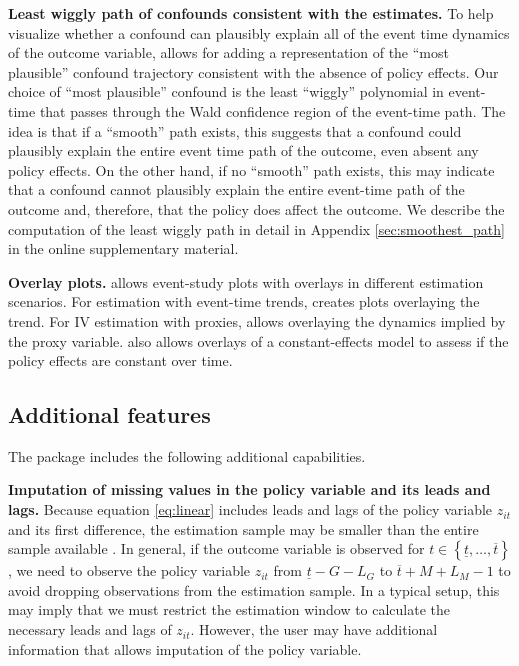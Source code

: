 \documentclass[12pt]{article}
\begin{document}
\noindent \textbf{Least wiggly path of confounds consistent with the estimates.}
To help visualize whether a confound can plausibly explain all of the event time dynamics of the outcome variable, \xtevent allows for adding a representation of the ``most plausible'' confound trajectory consistent with the absence of policy effects.
Our choice of ``most plausible'' confound is the least ``wiggly'' polynomial in event-time that passes through the Wald confidence region of the event-time path.
The idea is that if a ``smooth'' path exists, this suggests that a confound could plausibly explain the entire event time path of the outcome, even absent any policy effects.
On the other hand, if no ``smooth'' path exists, this may indicate that a confound cannot plausibly explain the entire event-time path of the outcome and, therefore, that the policy does affect the outcome.
We describe the computation of the least wiggly path in detail in Appendix \ref{sec:smoothest_path} in the online supplementary material.

\noindent \textbf{Overlay plots.}
\xteventplot allows event-study plots with overlays in different estimation scenarios. For estimation with event-time trends, \xteventplot creates plots overlaying the trend.
For IV estimation with proxies, \xteventplot allows overlaying the dynamics implied by the proxy variable.
\xteventplot also allows overlays of a constant-effects model to assess if the policy effects are constant over time.

\subsection{Additional features}
\label{subsec:additional_features}

The package includes the following additional capabilities.

\noindent \textbf{Imputation of missing values in the policy variable and its leads and lags.}
\label{newcite_sample}
Because equation \eqref{eq:linear} includes leads and lags of the policy variable $z_{it}$ and its first difference, the estimation sample may be smaller than the entire sample available \citep{schmidheiny2023event}.
In general, if the outcome variable is observed for $t \in \left\{\underline{t},\ldots,\overline{t} \right\}$, we need to observe the policy variable $z_{it}$ from $\underline{t} - G - L_G$ to $\overline{t} + M + L_M -1$ to avoid dropping observations from the estimation sample.
In a typical setup, this may imply that we must restrict the estimation window to calculate the necessary leads and lags of $z_{it}$.
However, the user may have additional information that allows imputation of the policy variable.
\end{document}
